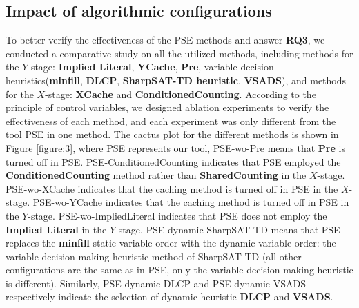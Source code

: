\subsection{Impact of algorithmic configurations}
To better verify the effectiveness of the PSE methods and answer \textbf{RQ3}, we conducted a comparative study on all the utilized methods, including methods for the $Y$-stage: \textbf{Implied Literal}, \textbf{YCache}, \textbf{Pre}, variable decision heuristics(\textbf{minfill}, \textbf{DLCP}, \textbf{SharpSAT-TD heuristic}, \textbf{VSADS}), and methods for the $X$-stage: \textbf{XCache} and \textbf{ConditionedCounting}.
According to the principle of control variables, we designed ablation experiments to verify the effectiveness of each method, and each experiment was only different from the tool PSE in one method.
The cactus plot for the different methods is shown in Figure \ref{figure:3}, where PSE represents our tool, PSE-wo-Pre means that \textbf{Pre} is turned off in PSE.
PSE-ConditionedCounting indicates that PSE employed the \textbf{ConditionedCounting} method rather than \textbf{SharedCounting} in the $X$-stage.
PSE-wo-XCache indicates that the caching method is turned off in PSE in the $X$-stage. 
PSE-wo-YCache indicates that the caching method is turned off in PSE in the $Y$-stage.
PSE-wo-ImpliedLiteral indicates that PSE does not employ the \textbf{Implied Literal} in the $Y$-stage.
PSE-dynamic-SharpSAT-TD means that PSE replaces the \textbf{minfill} static variable order with the dynamic variable order: the variable decision-making heuristic method of SharpSAT-TD (all other configurations are the same as in PSE, only the variable decision-making heuristic is different).
Similarly, PSE-dynamic-DLCP and PSE-dynamic-VSADS respectively indicate the selection of dynamic heuristic \textbf{DLCP} and \textbf{VSADS}.

